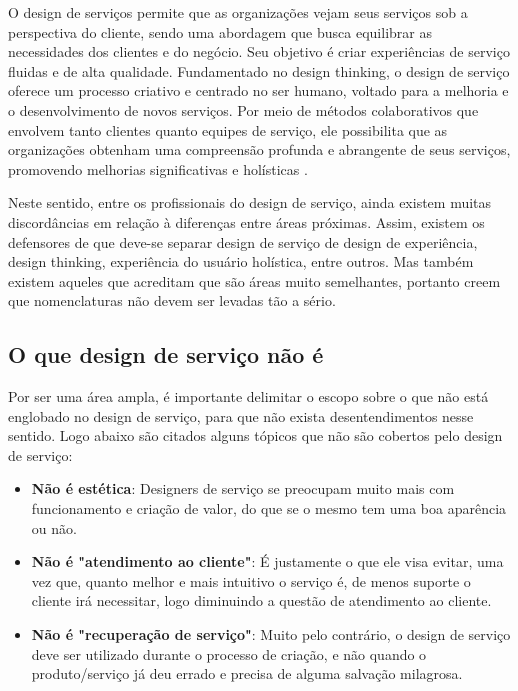 O design de serviços permite que as organizações vejam seus serviços sob a perspectiva do cliente, sendo uma abordagem que busca equilibrar as necessidades dos clientes e do negócio. Seu objetivo é criar experiências de serviço fluidas e de alta qualidade. Fundamentado no design thinking, o design de serviço oferece um processo criativo e centrado no ser humano, voltado para a melhoria e o desenvolvimento de novos serviços. Por meio de métodos colaborativos que envolvem tanto clientes quanto equipes de serviço, ele possibilita que as organizações obtenham uma compreensão profunda e abrangente de seus serviços, promovendo melhorias significativas e holísticas \cite{Stickdorn2019}.

Neste sentido, entre os profissionais do design de serviço, ainda existem muitas discordâncias em relação à diferenças entre áreas próximas. Assim, existem os defensores de que deve-se separar design de serviço de design de experiência, design thinking, experiência do usuário holística, entre outros. Mas também existem aqueles que acreditam que são áreas muito semelhantes, portanto creem que nomenclaturas não devem ser levadas tão a sério.

\subsection{O que design de serviço não é}

Por ser uma área ampla, é importante delimitar o escopo sobre o que não está englobado no design de serviço, para que não exista desentendimentos nesse sentido. Logo abaixo são citados alguns tópicos que não são cobertos pelo design de serviço:

\begin{itemize}
	\item \textbf{Não é estética}: Designers de serviço se preocupam muito mais com funcionamento e criação de valor, do que se o mesmo tem uma boa aparência ou não.
	
	\item \textbf{Não é "atendimento ao cliente"}: É justamente o que ele visa evitar, uma vez que, quanto melhor e mais intuitivo o serviço é, de menos suporte o cliente irá necessitar, logo diminuindo a questão de atendimento ao cliente.
	
	\item \textbf{Não é "recuperação de serviço"}: Muito pelo contrário, o design de serviço deve ser utilizado durante o processo de criação, e não quando o produto/serviço já deu errado e precisa de alguma salvação milagrosa.
	
\end{itemize}

